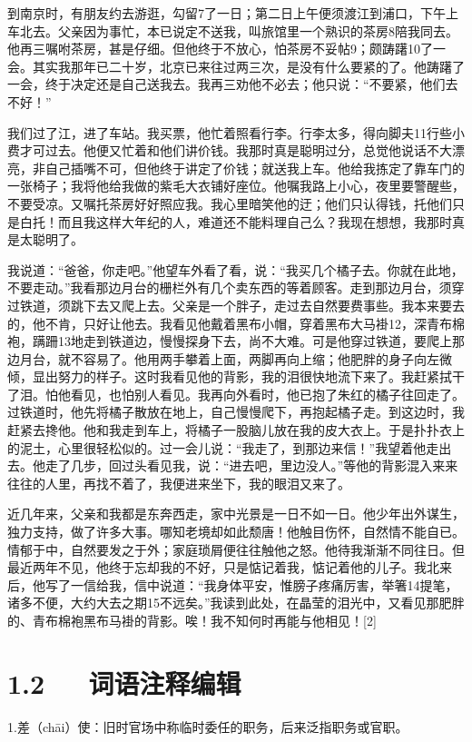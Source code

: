 \documentclass[letterpaper,12pt,english]{sphinxmanual}
\begin{document}
到南京时，有朋友约去游逛，勾留7了一日；第二日上午便须渡江到浦口，下午上车北去。父亲因为事忙，本已说定不送我，叫旅馆里一个熟识的茶房8陪我同去。他再三嘱咐茶房，甚是仔细。但他终于不放心，怕茶房不妥帖9；颇踌躇10了一会。其实我那年已二十岁，北京已来往过两三次，是没有什么要紧的了。他踌躇了一会，终于决定还是自己送我去。我再三劝他不必去；他只说：“不要紧，他们去不好！”

我们过了江，进了车站。我买票，他忙着照看行李。行李太多，得向脚夫11行些小费才可过去。他便又忙着和他们讲价钱。我那时真是聪明过分，总觉他说话不大漂亮，非自己插嘴不可，但他终于讲定了价钱；就送我上车。他给我拣定了靠车门的一张椅子；我将他给我做的紫毛大衣铺好座位。他嘱我路上小心，夜里要警醒些，不要受凉。又嘱托茶房好好照应我。我心里暗笑他的迂；他们只认得钱，托他们只是白托！而且我这样大年纪的人，难道还不能料理自己么？我现在想想，我那时真是太聪明了。

我说道：“爸爸，你走吧。”他望车外看了看，说：“我买几个橘子去。你就在此地，不要走动。”我看那边月台的栅栏外有几个卖东西的等着顾客。走到那边月台，须穿过铁道，须跳下去又爬上去。父亲是一个胖子，走过去自然要费事些。我本来要去的，他不肯，只好让他去。我看见他戴着黑布小帽，穿着黑布大马褂12，深青布棉袍，蹒跚13地走到铁道边，慢慢探身下去，尚不大难。可是他穿过铁道，要爬上那边月台，就不容易了。他用两手攀着上面，两脚再向上缩；他肥胖的身子向左微倾，显出努力的样子。这时我看见他的背影，我的泪很快地流下来了。我赶紧拭干了泪。怕他看见，也怕别人看见。我再向外看时，他已抱了朱红的橘子往回走了。过铁道时，他先将橘子散放在地上，自己慢慢爬下，再抱起橘子走。到这边时，我赶紧去搀他。他和我走到车上，将橘子一股脑儿放在我的皮大衣上。于是扑扑衣上的泥土，心里很轻松似的。过一会儿说：“我走了，到那边来信！”我望着他走出去。他走了几步，回过头看见我，说：“进去吧，里边没人。”等他的背影混入来来往往的人里，再找不着了，我便进来坐下，我的眼泪又来了。

近几年来，父亲和我都是东奔西走，家中光景是一日不如一日。他少年出外谋生，独力支持，做了许多大事。哪知老境却如此颓唐！他触目伤怀，自然情不能自已。情郁于中，自然要发之于外；家庭琐屑便往往触他之怒。他待我渐渐不同往日。但最近两年不见，他终于忘却我的不好，只是惦记着我，惦记着他的儿子。我北来后，他写了一信给我，信中说道：“我身体平安，惟膀子疼痛厉害，举箸14提笔，诸多不便，大约大去之期15不远矣。”我读到此处，在晶莹的泪光中，又看见那肥胖的、青布棉袍黑布马褂的背影。唉！我不知何时再能与他相见！{[}2{]}


\section{1.2   词语注释编辑}
\label{\detokenize{p01_u6563_u6587/_u6731_u81ea_u6e05-_u80cc_u5f71:id4}}
1.差（chāi）使：旧时官场中称临时委任的职务，后来泛指职务或官职。
\end{document}
